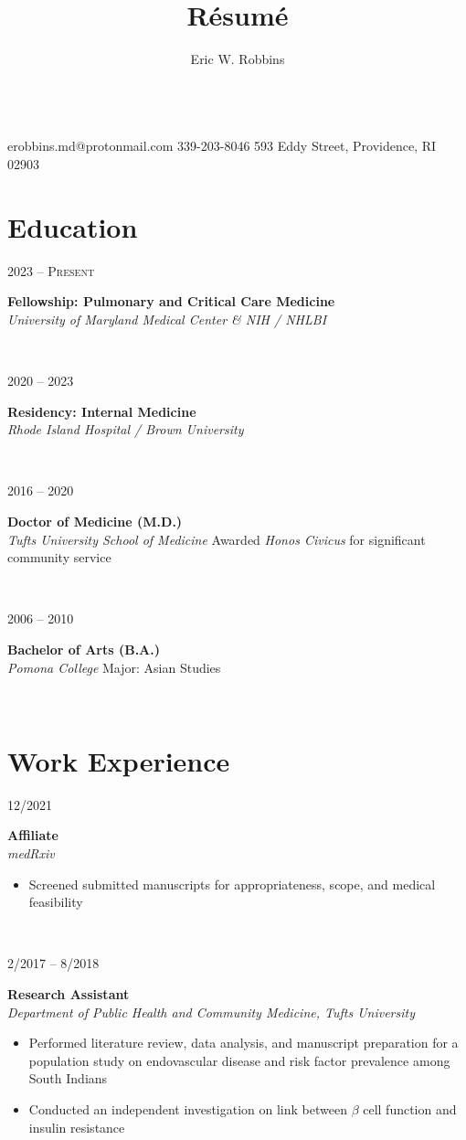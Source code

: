 \documentclass{book}
\title{R\'esum\'e}
\author{Eric W. Robbins}
\date{}
\makeatletter
\newcommand\colleft{.20}
\newcommand\colright{.75}
\newcommand\mohan{Mohan Thanikachalam, MD}
\newcommand{\entryfour}[4]
	{
		\begin{minipage}[t]{\colleft\textwidth}
		\hfill \textsc{#1}
		\end{minipage}
		\hfill\vline\hfill
		\begin{minipage}[t]{\colright\textwidth}
		{\bf#2}\\
		\textit{#3}
		\footnotesize{#4}
		\end{minipage}\\
		\entryvspace
	}%
\newcommand{\entryvspace}{\vspace{0.5em}}
\newcommand{\fellowship}{University of Maryland Medical Center \& NIH / NHLBI}
\newcommand{\residency}{Rhode Island Hospital / Brown University}
\newcommand{\medschool}{Tufts University School of Medicine}
\newcommand{\undergrad}{Pomona College}
\newcommand{\cphone}{339-203-8046}
\newcommand{\address}{593 Eddy Street, Providence, RI 02903}
\newcommand{\email}{erobbins.md@protonmail.com}
\renewcommand{\maketitle}{
\begin{center}
	{\huge\bfseries\theauthor}
	\vspace{0.25em}\\
	\email
	\hspace{1em}\vline \hspace{1em}%
	\cphone
	\hspace{1em}\vline \hspace{1em}
	\address
\end{center}
}
\makeatother
\begin{document}
	\maketitle
	\section*{Education}
		\entryfour{2023 -- Present}
			{Fellowship: Pulmonary and Critical Care Medicine}
			{\fellowship}
			{}
			
		\entryfour{2020 -- 2023}
			{Residency: Internal Medicine}
			{\residency}
			{}
			
		\entryfour{2016 -- 2020}
			{Doctor of Medicine (M.D.)}
			{\medschool}
			{Awarded \textit{Honos Civicus} for significant community service}
			
		\entryfour{2006 -- 2010}
		{Bachelor of Arts (B.A.)}
		{\undergrad}
		{Major: Asian Studies}
	\section*{Work Experience}
		\entryfour{12/2021}{Affiliate}{medRxiv}{%
			\begin{itemize}
				\item Screened submitted manuscripts for appropriateness, scope, and medical feasibility
			\end{itemize}
			}

		
		\entryfour{2/2017 -- 8/2018}{Research Assistant}{Department of Public Health and Community Medicine, Tufts University}{%
		\begin{itemize}
			\item Performed literature review, data analysis, and manuscript preparation for a population study on endovascular disease and risk factor prevalence among South Indians
			\item Conducted an independent investigation on link between $\beta$ cell function and insulin resistance
		\end{itemize}
	}
\end{document}
